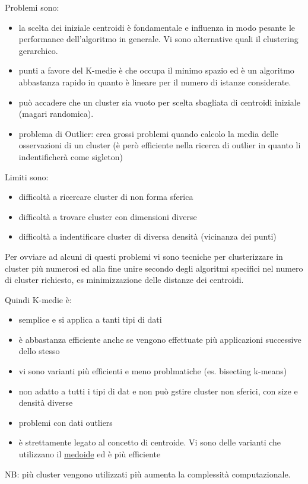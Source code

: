 Problemi sono:
\begin{itemize}
	\item la scelta dei iniziale centroidi \`e fondamentale e influenza in modo pesante le performance dell'algoritmo in generale. Vi sono alternative quali il clustering gerarchico.
	\item punti a favore del K-medie \`e che occupa il minimo spazio ed \`e un algoritmo abbastanza rapido in quanto \`e lineare per il numero di istanze considerate. 
	\item pu\`o accadere che un cluster sia vuoto per scelta sbagliata di centroidi iniziale (magari randomica).
	\item problema di Outlier: crea grossi problemi quando calcolo la media delle osservazioni di un cluster (\`e per\`o efficiente nella ricerca di outlier in quanto li indentificher\`a come sigleton)
	
\end{itemize}

Limiti sono:
\begin{itemize}
	\item difficolt\`a a ricercare cluster di non forma sferica
	\item difficolt\`a a trovare cluster con dimensioni diverse
	\item difficolt\`a a indentificare cluster di diversa densit\`a (vicinanza dei punti)
\end{itemize}

Per ovviare ad alcuni di questi problemi vi sono tecniche per clusterizzare in cluster pi\`u numerosi ed alla fine unire secondo degli algoritmi specifici nel numero di cluster richiesto, es minimizzazione delle distanze dei centroidi. 

Quindi K-medie \`e:
\begin{itemize}
	\item semplice e si applica a tanti tipi di dati
	\item \`e abbastanza efficiente anche se vengono effettuate pi\`u applicazioni successive dello stesso
	\item vi sono varianti pi\`u efficienti e meno problmatiche (es. bisecting k-means)
	\item non adatto a tutti i tipi di dat e non pu\`o gstire cluster non sferici, con size e densit\`a diverse
	\item problemi con dati outliers
	\item \`e strettamente legato al concetto di centroide. Vi sono delle varianti che utilizzano il \underline{medoide} ed \`e pi\`u efficiente
	
	
\end{itemize}
NB: pi\`u cluster vengono utilizzati pi\`u aumenta la complessit\`a computazionale.


